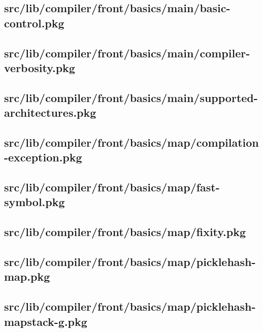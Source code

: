 \subsection{src/lib/compiler/front/basics/main/basic-control.pkg}


\subsection{src/lib/compiler/front/basics/main/compiler-verbosity.pkg}


\subsection{src/lib/compiler/front/basics/main/supported-architectures.pkg}


\subsection{src/lib/compiler/front/basics/map/compilation-exception.pkg}


\subsection{src/lib/compiler/front/basics/map/fast-symbol.pkg}


\subsection{src/lib/compiler/front/basics/map/fixity.pkg}


\subsection{src/lib/compiler/front/basics/map/picklehash-map.pkg}


\subsection{src/lib/compiler/front/basics/map/picklehash-mapstack-g.pkg}


